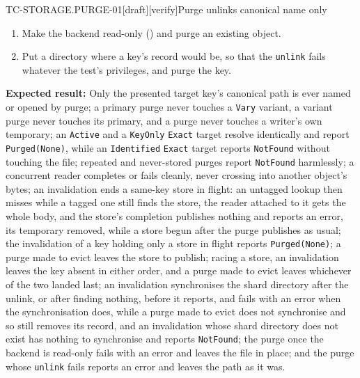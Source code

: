 \begin{requirement}{TC-STORAGE.PURGE-01}[draft][verify]{Purge unlinks canonical name only}
\begin{enumerate}
      directory synchronisation made to fail (e.g.\ over a device-mapper
      \texttt{flakey} target), purge another. With synchronisation still
      failing, evict an existing object, then invalidate the evicted key,
      and invalidate a key whose shard directory does not exist.
    \item Make the backend read-only () and
      purge an existing object.
    \item Put a directory where a key's record would be, so that the
      \texttt{unlink} fails whatever the test's privileges, and purge the
      key.
  \end{enumerate}

  \textbf{Expected result:} Only the presented target key's canonical path is
  ever named or opened by purge; a primary purge never touches a \texttt{Vary}
  variant, a variant purge never touches its primary, and a purge never
  touches a writer's own temporary; an \texttt{Active} and a
  \texttt{KeyOnly} \texttt{Exact} target resolve identically and report
  \texttt{Purged(None)}, while an \texttt{Identified} \texttt{Exact} target
  reports \texttt{NotFound} without touching the file; repeated and
  never-stored purges report \texttt{NotFound} harmlessly; a concurrent reader completes or fails cleanly, never
  crossing into another object's bytes; an invalidation ends a same-key
  store in flight: an untagged lookup then misses while a tagged one still
  finds the store, the reader attached to it gets the whole body, and the
  store's completion publishes nothing and reports an error, its temporary
  removed, while a store begun after the purge publishes as usual; the
  invalidation of a key holding only a store in flight reports
  \texttt{Purged(None)}; a purge made to evict leaves the store to publish;
  racing a store, an invalidation leaves the key absent in either order,
  and a purge made to evict leaves whichever of the two landed last; an
  invalidation
  synchronises the shard directory after the unlink, or after finding
  nothing, before it reports, and fails with an error when the
  synchronisation does, while a purge made to evict does not synchronise and
  so still removes its record, and an invalidation whose shard directory does
  not exist has nothing to synchronise and reports \texttt{NotFound};
  the purge once the backend is read-only fails with an error and leaves
  the file in place; and the purge whose \texttt{unlink} fails reports an
  error and leaves the path as it was.



\end{requirement}

